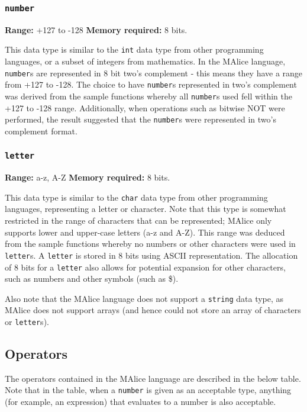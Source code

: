 \documentclass[a4wide, 10pt]{article}
\newcommand{\tab}{\hspace*{2em}}
\begin{document}
\subsubsection{\texttt{number}}
\label{sec:number}
{\bf Range:} +127 to -128 {\bf Memory required:} 8 bits.
 
\tab This data type is similar to the \texttt{int} data type from other 
programming languages, or a subset of integers from mathematics. In the MAlice 
language, \texttt{number}s are represented in 8 bit two's complement - this
means they have a range from +127 to -128. The choice to have \texttt{number}s
represented in two's complement was derived from the sample functions whereby
all \texttt{number}s used fell within the +127 to -128 range. Additionally, when
operations such as bitwise NOT were performed, the result suggested that the 
\texttt{number}s were represented in two's complement format.

\subsubsection{\texttt{letter}}

{\bf Range:} a-z, A-Z {\bf Memory required:} 8 bits.

\tab This data type is similar to the \texttt{char} data type from other
programming languages, representing a letter or character. Note that this type
is somewhat restricted in the range of characters that can be represented; MAlice
only supports lower and upper-case letters (a-z and A-Z). This range was deduced
from the sample functions whereby no numbers or other characters were used in
\texttt{letter}s. A \texttt{letter} is stored in 8 bits using ASCII 
representation. The allocation of 8 bits for a \texttt{letter} also allows for
potential expansion for other characters, such as numbers and other symbols 
(such as \$).

Also note that the MAlice language does not support a \texttt{string} data 
type, as MAlice does not support arrays (and hence could not store an array of
characters or \texttt{letter}s).

\subsection{Operators}
The operators contained in the MAlice language are described in the below table.
Note that in the table, when a \texttt{number} is given as an acceptable type,
anything (for example, an expression) that evaluates to a number is also
acceptable.
\end{document}
